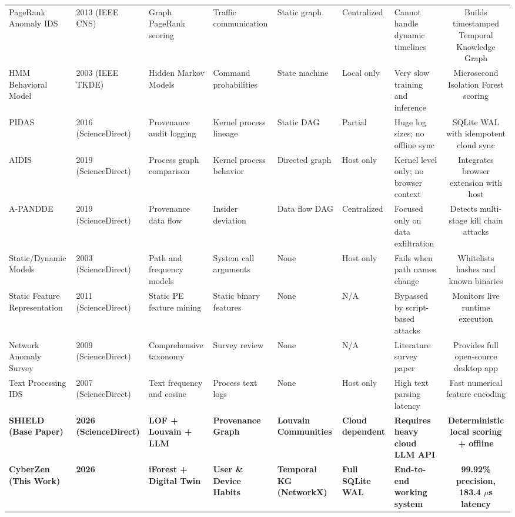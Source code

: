 \documentclass[conference]{IEEEtran}
\begin{document}
\begin{table}[t]
{\begin{tabular}{@{}lllllllc@{}}
PageRank Anomaly IDS \cite{zhang2013pagerank} & 2013 (IEEE CNS) & Graph PageRank scoring & Traffic communication & Static graph & Centralized & Cannot handle dynamic timelines & Builds timestamped Temporal Knowledge Graph \\
HMM Behavioral Model \cite{yeung2002host} & 2003 (IEEE TKDE) & Hidden Markov Models & Command probabilities & State machine & Local only & Very slow training and inference & Microsecond Isolation Forest scoring \\
PIDAS \cite{han2016pidas} & 2016 (ScienceDirect) & Provenance audit logging & Kernel process lineage & Static DAG & Partial & Huge log sizes; no offline sync & SQLite WAL with idempotent cloud sync \\
AIDIS \cite{aldujaili2019aidis} & 2019 (ScienceDirect) & Process graph comparison & Kernel process behavior & Directed graph & Host only & Kernel level only; no browser context & Integrates browser extension with host \\
A-PANDDE \cite{liu2019apandde} & 2019 (ScienceDirect) & Provenance data flow & Insider deviation & Data flow DAG & Centralized & Focused only on data exfiltration & Detects multi-stage kill chain attacks \\
Static/Dynamic Models \cite{kruegel2003host} & 2003 (ScienceDirect) & Path and frequency models & System call arguments & None & Host only & Fails when path names change & Whitelists hashes and known binaries \\
Static Feature Representation \cite{rieck2011static} & 2011 (ScienceDirect) & Static PE feature mining & Static binary features & None & N/A & Bypassed by script-based attacks & Monitors live runtime execution \\
Network Anomaly Survey \cite{garcia2009anomaly} & 2009 (ScienceDirect) & Comprehensive taxonomy & Survey review & None & N/A & Literature survey paper & Provides full open-source desktop app \\
Text Processing IDS \cite{liao2007intrusion} & 2007 (ScienceDirect) & Text frequency and cosine & Process text logs & None & Host only & High text parsing latency & Fast numerical feature encoding \\
\midrule
\textbf{SHIELD (Base Paper)} \cite{shield2026provenance} & \textbf{2026 (ScienceDirect)} & \textbf{LOF + Louvain + LLM} & \textbf{Provenance Graph} & \textbf{Louvain Communities} & \textbf{Cloud dependent} & \textbf{Requires heavy cloud LLM API} & \textbf{Deterministic local scoring + offline} \\
\textbf{CyberZen (This Work)} & \textbf{2026} & \textbf{iForest + Digital Twin} & \textbf{User \& Device Habits} & \textbf{Temporal KG (NetworkX)} & \textbf{Full SQLite WAL} & \textbf{End-to-end working system} & \textbf{99.92\% precision, 183.4 $\mu$s latency} \\
\bottomrule
\end{tabular}
}
\end{table}
\end{document}
